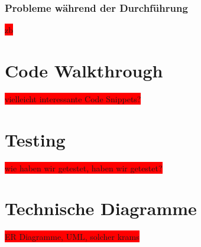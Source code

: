 \documentclass[10pt, a4paper, draft]{article}
\begin{document}
\subsubsection{Probleme während der Durchführung}
\colorbox{red}{zb }
\section{Code Walkthrough}
\colorbox{red}{vielleicht interessante Code Snippets?}
\section{Testing}
\colorbox{red}{wie haben wir getestet, haben wir getestet?}
\section{Technische Diagramme}
\colorbox{red}{ER Diagramme, UML, solcher krams}
 
\end{document}

